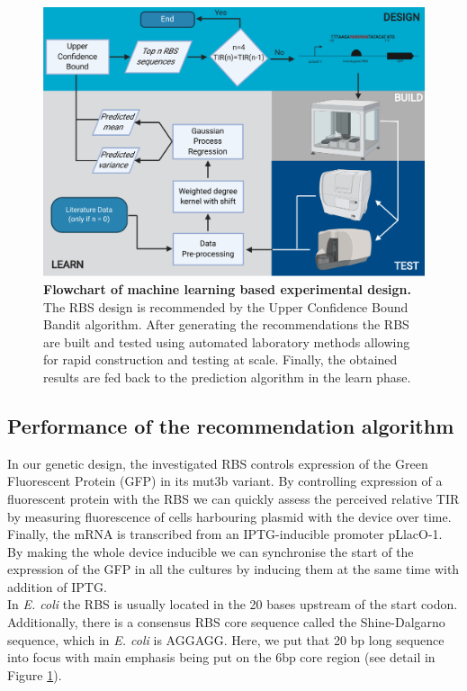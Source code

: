 \documentclass{article}
\begin{document}
\begin{figure}[h]
    \centering
    \includegraphics[scale=0.7]{plots/Main_Paper/flowchart.pdf}
    \caption{\textbf{Flowchart of machine learning based experimental design.} The RBS design is recommended by the Upper Confidence Bound Bandit algorithm. After generating the recommendations the RBS are built and tested using automated laboratory methods allowing for rapid construction and testing at scale. Finally, the obtained results are fed back to the prediction algorithm in the learn phase. }
    \label{fig: Flowchart}
\end{figure}



\subsection{Performance of the recommendation algorithm}
In our genetic design, the investigated RBS controls expression of the Green Fluorescent Protein (GFP) in its mut3b variant. 
By controlling expression of a fluorescent protein with the RBS we can quickly assess the perceived relative TIR by measuring fluorescence of cells harbouring plasmid with the device over time.
Finally, the mRNA is transcribed from an IPTG-inducible promoter pLlacO-1. 
By making the whole device inducible we can synchronise the start of the expression of the GFP in all the cultures by inducing them at the same time with addition of IPTG.\\

In \emph{E. coli} the RBS is usually located in the 20 bases upstream of the start codon. 
Additionally, there is a consensus RBS core sequence called the Shine-Dalgarno sequence, which in \emph{E. coli} is AGGAGG. 
Here, we put that 20 bp long sequence into focus with main emphasis being put on the 6bp core region (see detail in Figure \ref{fig: Flowchart}).\\
\end{document}
